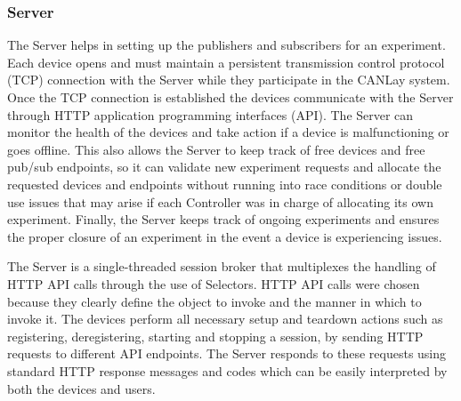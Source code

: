 \documentclass[letterpaper,twocolumn,12pt]{article}
\begin{document}
\subsubsection{Server}
The Server helps in setting up the publishers and subscribers for an experiment. Each device opens and must maintain a persistent transmission control protocol (TCP) connection with the Server while they participate in the CANLay system. Once the TCP connection is established the devices communicate with the Server through HTTP application programming interfaces (API). The Server can monitor the health of the devices and take action if a device is malfunctioning or goes offline. This also allows the Server to keep track of free devices and free pub/sub endpoints, so it can validate new experiment requests and allocate the requested devices and endpoints without running into race conditions or double use issues that may arise if each Controller was in charge of allocating its own experiment. Finally, the Server keeps track of ongoing experiments and ensures the proper closure of an experiment in the event a device is experiencing issues.

The Server is a single-threaded session broker that multiplexes the handling of HTTP API calls through the use of Selectors. HTTP API calls were chosen because they clearly define the object to invoke and the manner in which to invoke it. The devices perform all necessary setup and teardown actions such as registering, deregistering, starting and stopping a session, by sending HTTP requests to different API endpoints. The Server responds to these requests using standard HTTP response messages and codes which can be easily interpreted by both the devices and users.


\end{document}
